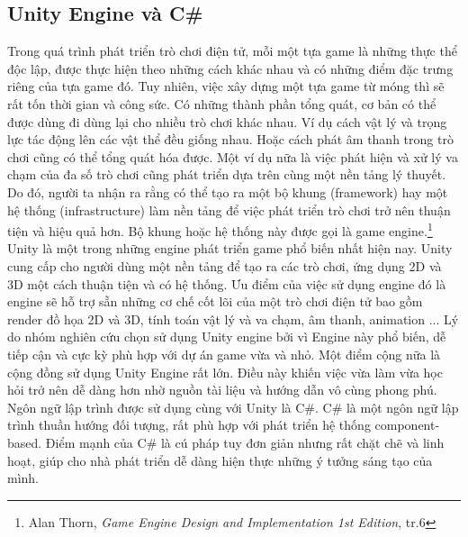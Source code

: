\subsection{Unity Engine và C\#}
Trong quá trình phát triển trò chơi điện tử, mỗi một tựa game là những thực thể độc lập, được thực hiện theo những cách khác nhau và có những điểm đặc trưng riêng của tựa game đó. Tuy nhiên, việc xây dựng một tựa game từ móng thì sẽ rất tốn thời gian và công sức. Có những thành phần tổng quát, cơ bản có thể được dùng đi dùng lại cho nhiều trò chơi khác nhau. Ví dụ cách vật lý và trọng lực tác động lên các vật thể đều giống nhau. Hoặc cách phát âm thanh trong trò chơi cũng có thể tổng quát hóa được. Một ví dụ nữa là việc phát hiện và xử lý va chạm của đa số trò chơi cũng phát triển dựa trên cùng một nền tảng lý thuyết. Do đó, người ta nhận ra rằng có thể tạo ra một bộ khung (framework) hay một hệ thống (infrastructure) làm nền tảng để việc phát triển trò chơi trở nên thuận tiện và hiệu quả hơn. Bộ khung hoặc hệ thống này được gọi là game engine.\footnote{Alan Thorn, \textit{Game Engine Design and Implementation 1st Edition}, tr.6}\\

Unity là một trong những engine phát triển game phổ biến nhất hiện nay. Unity cung cấp cho người dùng một nền tảng để tạo ra các trò chơi, ứng dụng 2D và 3D một cách thuận tiện và có hệ thống. Ưu điểm của việc sử dụng engine đó là engine sẽ hỗ trợ sẵn những cơ chế cốt lõi của một trò chơi điện tử bao gồm render đồ họa 2D và 3D, tính toán vật lý và va chạm, âm thanh, animation ... Lý do nhóm nghiên cứu chọn sử dụng Unity engine bởi vì Engine này phổ biến, dễ tiếp cận và cực kỳ phù hợp với dự án game vừa và nhỏ. Một điểm cộng nữa là cộng đồng sử dụng Unity Engine rất lớn. Điều này khiến việc vừa làm vừa học hỏi trở nên dễ dàng hơn nhờ nguồn tài liệu và hướng dẫn vô cùng phong phú.\\

Ngôn ngữ lập trình được sử dụng cùng với Unity là C\#. C\# là một ngôn ngữ lập trình thuần hướng đối tượng, rất phù hợp với phát triển hệ thống component-based. Điểm mạnh của C\# là cú pháp tuy đơn giản nhưng rất chặt chẽ và linh hoạt, giúp cho nhà phát triển dễ dàng hiện thực những ý tưởng sáng tạo của mình.\\